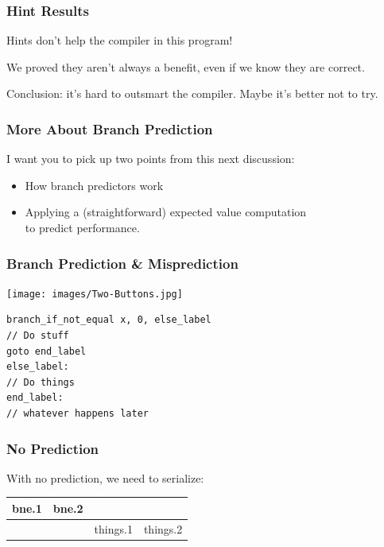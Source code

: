 \begin{frame}
\frametitle{Hint Results}

Hints don't help the compiler in this program!

We proved they aren't always a benefit, even if we know they are correct.

Conclusion: it's hard to outsmart the compiler. Maybe it's better not to try.



\end{frame}


\begin{frame}
\frametitle{More About Branch Prediction}

I want you to pick up two points from this next discussion:

\begin{itemize}
\item How branch predictors work
\item Applying a (straightforward) expected value computation \\
\qquad to predict performance.
\end{itemize}



\end{frame}


\begin{frame}[fragile]
\frametitle{Branch Prediction \& Misprediction}

\begin{minipage}{.4\textwidth}
\begin{center}
	\texttt{[image: images/Two-Buttons.jpg]}
\end{center}
\end{minipage}
\hspace*{2em} \begin{minipage}{.4\textwidth} \begin{lstlisting}
branch_if_not_equal x, 0, else_label
// Do stuff
goto end_label
else_label:
// Do things
end_label:
// whatever happens later
\end{lstlisting}
\end{minipage}

\end{frame}



\begin{frame}
\frametitle{No Prediction}

With no prediction, we need to serialize:

\begin{center}
\begin{tabular}{c|c|c|c}
bne.1 & bne.2 \\ \hline
& & things.1 & things.2
\end{tabular}
\end{center}

\end{frame}



